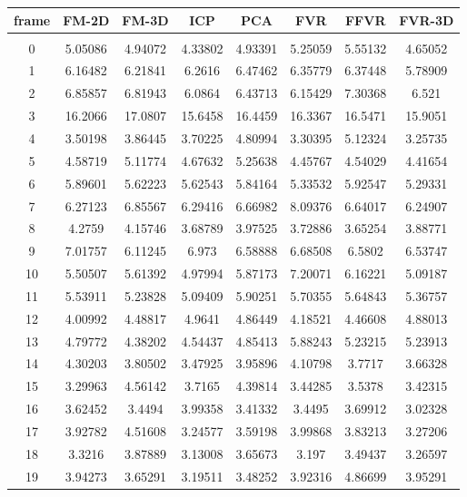 \begin{center}
\begin{longtable}{cccccccc}
\hline
\textbf{frame} & \textbf{FM-2D} & \textbf{FM-3D} & \textbf{ICP} & \textbf{PCA} & \textbf{FVR} & \textbf{FFVR} & \textbf{FVR-3D} \\
\hline \\
0 & 5.05086 & 4.94072 & 4.33802 & 4.93391 & 5.25059 & 5.55132 & 4.65052\\
1 & 6.16482 & 6.21841 & 6.2616 & 6.47462 & 6.35779 & 6.37448 & 5.78909\\
2 & 6.85857 & 6.81943 & 6.0864 & 6.43713 & 6.15429 & 7.30368 & 6.521\\
3 & 16.2066 & 17.0807 & 15.6458 & 16.4459 & 16.3367 & 16.5471 & 15.9051\\
4 & 3.50198 & 3.86445 & 3.70225 & 4.80994 & 3.30395 & 5.12324 & 3.25735\\
5 & 4.58719 & 5.11774 & 4.67632 & 5.25638 & 4.45767 & 4.54029 & 4.41654\\
6 & 5.89601 & 5.62223 & 5.62543 & 5.84164 & 5.33532 & 5.92547 & 5.29331\\
7 & 6.27123 & 6.85567 & 6.29416 & 6.66982 & 8.09376 & 6.64017 & 6.24907\\
8 & 4.2759 & 4.15746 & 3.68789 & 3.97525 & 3.72886 & 3.65254 & 3.88771\\
9 & 7.01757 & 6.11245 & 6.973 & 6.58888 & 6.68508 & 6.5802 & 6.53747\\
10 & 5.50507 & 5.61392 & 4.97994 & 5.87173 & 7.20071 & 6.16221 & 5.09187\\
11 & 5.53911 & 5.23828 & 5.09409 & 5.90251 & 5.70355 & 5.64843 & 5.36757\\
12 & 4.00992 & 4.48817 & 4.9641 & 4.86449 & 4.18521 & 4.46608 & 4.88013\\
13 & 4.79772 & 4.38202 & 4.54437 & 4.85413 & 5.88243 & 5.23215 & 5.23913\\
14 & 4.30203 & 3.80502 & 3.47925 & 3.95896 & 4.10798 & 3.7717 & 3.66328\\
15 & 3.29963 & 4.56142 & 3.7165 & 4.39814 & 3.44285 & 3.5378 & 3.42315\\
16 & 3.62452 & 3.4494 & 3.99358 & 3.41332 & 3.4495 & 3.69912 & 3.02328\\
17 & 3.92782 & 4.51608 & 3.24577 & 3.59198 & 3.99868 & 3.83213 & 3.27206\\
18 & 3.3216 & 3.87889 & 3.13008 & 3.65673 & 3.197 & 3.49437 & 3.26597\\
19 & 3.94273 & 3.65291 & 3.19511 & 3.48252 & 3.92316 & 4.86699 & 3.95291\\

\end{longtable}
\end{center}
